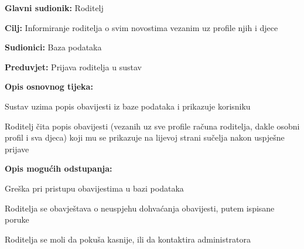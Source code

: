 					\noindent {}
					\begin{packed_item}
						
						\item \textbf{Glavni sudionik: }Roditelj
						\item  \textbf{Cilj:} Informiranje roditelja o svim novostima vezanim uz profile njih i djece
						\item  \textbf{Sudionici:} Baza podataka
						\item  \textbf{Preduvjet:} Prijava roditelja u sustav
						\item  \textbf{Opis osnovnog tijeka:}
						
						\item[] \begin{packed_enum}
							
							\item Sustav uzima popis obavijesti iz baze podataka i prikazuje korisniku
							\item Roditelj čita popis obavijesti (vezanih uz sve profile računa roditelja, dakle osobni profil i sva djeca) koji mu se prikazuje na lijevoj strani sučelja nakon uspješne prijave
							
						\end{packed_enum}
						\item  \textbf{Opis mogućih odstupanja:}
						
						\item[] \begin{packed_item}
							
							\item[1.a] Greška pri pristupu obavijestima u bazi podataka
							\item[] \begin{packed_enum}
								
								\item Roditelja se obavještava o neuspjehu dohvaćanja obavijesti, putem ispisane poruke
								\item Roditelja se moli da pokuša kasnije, ili da kontaktira administratora
								
							\end{packed_enum}
						\end{packed_item}
					\end{packed_item}
					
